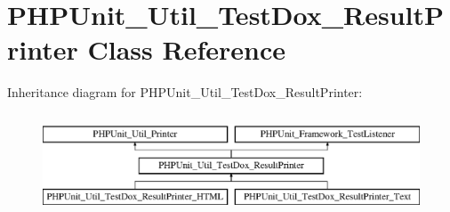 \hypertarget{class_p_h_p_unit___util___test_dox___result_printer}{}\section{P\+H\+P\+Unit\+\_\+\+Util\+\_\+\+Test\+Dox\+\_\+\+Result\+Printer Class Reference}
\label{class_p_h_p_unit___util___test_dox___result_printer}
Inheritance diagram for P\+H\+P\+Unit\+\_\+\+Util\+\_\+\+Test\+Dox\+\_\+\+Result\+Printer\+:\begin{figure}[H]
\begin{center}
\leavevmode
\includegraphics[height=3.000000cm]{class_p_h_p_unit___util___test_dox___result_printer}
\end{center}
\end{figure}
